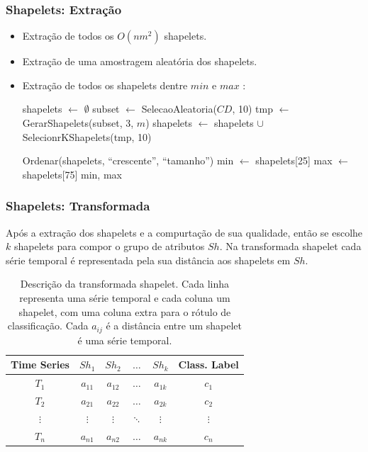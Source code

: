 \documentclass{beamer}
\begin{document}
\begin{frame}
\frametitle{Shapelets: Extra{\c c}{\~a}o}

\begin{itemize}
\item Extra{\c c}{\~a}o de todos os $O(nm^{2})$ shapelets.
\item Extra{\c c}{\~a}o de uma amostragem aleat{\'o}ria dos shapelets.
\item Extra{\c c}{\~a}o de todos os shapelets dentre $min$ e $max$ \cite{Hills:2013dk}:

\begin{algorithmic}
\small
{}
	\State shapelets $\leftarrow$ $\emptyset$
    	\State subset $\leftarrow$ SelecaoAleatoria($CD$, 10)
    	\State tmp $\leftarrow$ GerarShapelets(subset, 3, $m$)
        \State shapelets $\leftarrow$ shapelets $\cup$ SelecionrKShapelets(tmp, 10)
    \EndFor

    \State Ordenar(shapelets, ``crescente'', ``tamanho'')
    \State min $\leftarrow$ shapelets[25]
    \State max $\leftarrow$ shapelets[75]
    \State \Return min, max
\EndFunction
\end{algorithmic}
\end{itemize}
\end{frame}


\begin{frame}
\frametitle{Shapelets: Transformada}

Ap{\'o}s a extra{\c c}{\~a}o dos shapelets e a compurta{\c c}{\~a}o de sua qualidade, ent{\~a}o se escolhe $k$ shapelets para compor o grupo de atributos $Sh$. Na transformada shapelet cada s{\'e}rie temporal {\'e} representada pela sua dist{\^a}ncia aos shapelets em $Sh$.

\begin{table}
\centering
\small
\caption{Descri{\c c}{\~a}o da transformada shapelet. Cada linha representa uma s{\'e}rie temporal e cada coluna um shapelet, com uma coluna extra para o r{\'o}tulo de classifica{\c c}{\~a}o. Cada $a_{ij}$ {\'e} a dist{\^a}ncia entre um shapelet {\'e} uma s{\'e}rie temporal.}
\label{tab-shapelet-transform}
\begin{tabular}{c | c c c c c}
Time Series & $Sh_{1}$ & $Sh_{2}$ & $\ldots$ & $Sh_{k}$ & Class. Label \\ \hline
$T_{1}$ & $a_{11}$ & $a_{12}$ & $\ldots$ & $a_{1k}$ & $c_{1}$ \\
$T_{2}$ & $a_{21}$ & $a_{22}$ & $\ldots$ & $a_{2k}$ & $c_{2}$ \\
$\vdots$ & $\vdots$ & $\vdots$ & $\ddots$ & $\vdots$ & $\vdots$ \\
$T_{n}$ & $a_{n1}$ & $a_{n2}$ & $\ldots$ & $a_{nk}$ & $c_{n}$ \\ \hline
\end{tabular}
\end{table}
\end{frame}
\end{document}
